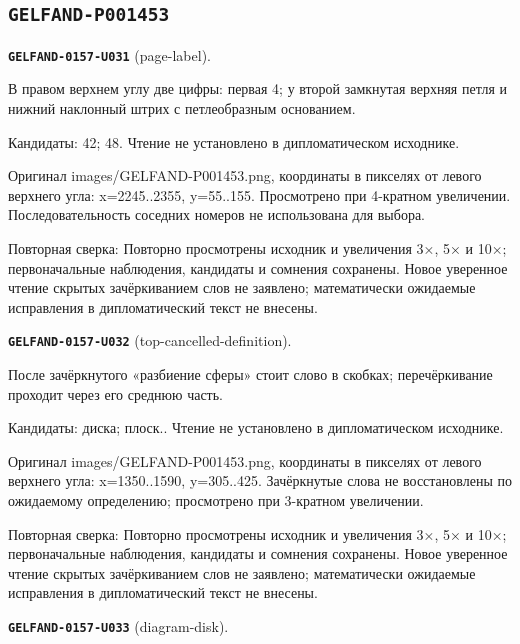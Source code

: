 \subsection*{\texttt{GELFAND-P001453}}
\par\noindent\leavevmode{}\label{GELFAND-0157-U031}\label{GELFAND-P001453:page-label}\textbf{\texttt{GELFAND-0157-U031}} (page-label).\nopagebreak[4]\par
В правом верхнем углу две цифры: первая 4; у второй замкнутая верхняя петля и нижний наклонный штрих с петлеобразным основанием.\par
Кандидаты: 42; 48. Чтение не установлено в дипломатическом исходнике.\par
Оригинал images/GELFAND-P001453.png, координаты в пикселях от левого верхнего угла: x=2245..2355, y=55..155. Просмотрено при 4-кратном увеличении. Последовательность соседних номеров не использована для выбора.\par
Повторная сверка: Повторно просмотрены исходник и увеличения 3×, 5× и 10×; первоначальные наблюдения, кандидаты и сомнения сохранены. Новое уверенное чтение скрытых зачёркиванием слов не заявлено; математически ожидаемые исправления в дипломатический текст не внесены.\par\medskip
\par\noindent\leavevmode{}\label{GELFAND-0157-U032}\label{GELFAND-P001453:top-cancelled-definition}\textbf{\texttt{GELFAND-0157-U032}} (top-cancelled-definition).\nopagebreak[4]\par
После зачёркнутого «разбиение сферы» стоит слово в скобках; перечёркивание проходит через его среднюю часть.\par
Кандидаты: диска; плоск.. Чтение не установлено в дипломатическом исходнике.\par
Оригинал images/GELFAND-P001453.png, координаты в пикселях от левого верхнего угла: x=1350..1590, y=305..425. Зачёркнутые слова не восстановлены по ожидаемому определению; просмотрено при 3-кратном увеличении.\par
Повторная сверка: Повторно просмотрены исходник и увеличения 3×, 5× и 10×; первоначальные наблюдения, кандидаты и сомнения сохранены. Новое уверенное чтение скрытых зачёркиванием слов не заявлено; математически ожидаемые исправления в дипломатический текст не внесены.\par\medskip
\par\noindent\leavevmode{}\label{GELFAND-0157-U033}\label{GELFAND-P001453:diagram-disk}\textbf{\texttt{GELFAND-0157-U033}} (diagram-disk).\nopagebreak[4]\par
